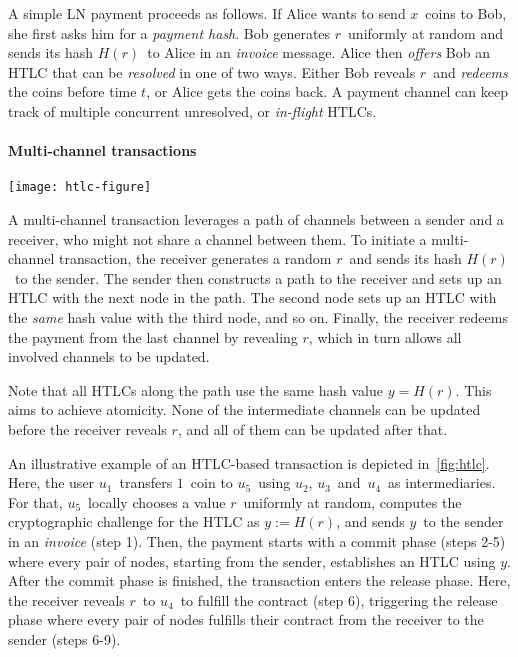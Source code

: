 A simple LN payment proceeds as follows.
If Alice wants to send $x$~coins to Bob, she first asks him for a \textit{payment hash}.
Bob generates $r$~uniformly at random and sends its hash $H(r)$~to Alice in an \textit{invoice} message.
Alice then \textit{offers} Bob an HTLC that can be \textit{resolved} in one of two ways.
Either Bob reveals $r$~and \textit{redeems} the coins before time $t$, or Alice gets the coins back.
A payment channel can keep track of multiple concurrent unresolved, or \textit{in-flight} HTLCs.


\paragraph{Multi-channel transactions}

\begin{figure*}[h]
	\texttt{[image: htlc-figure]}
	\caption{An HTLC-based payment in the Lightning Network.}
	\label{fig:htlc}
\end{figure*}

A multi-channel transaction leverages a path of channels between a sender and a receiver, who might not share a channel between them.
To initiate a multi-channel transaction, the receiver generates a random $r$~and sends its hash $H(r)$~to the sender.
The sender then constructs a path to the receiver and sets up an HTLC with the next node in the path.
The second node sets up an HTLC with the \textit{same} hash value with the third node, and so on.
Finally, the receiver redeems the payment from the last channel by revealing $r$, which in turn allows all involved channels to be updated.

Note that all HTLCs along the path use the same hash value $y=H(r)$.
This aims to achieve atomicity.
None of the intermediate channels can be updated before the receiver reveals $r$, and all of them can be updated after that.

An illustrative example of an HTLC-based transaction is depicted in~\cref{fig:htlc}.
Here, the user $u_1$~transfers $1$~coin to $u_5$~using $u_2$, $u_3$~and~$u_4$~as intermediaries.
For that, $u_5$~locally chooses a value $r$~uniformly at random, computes the cryptographic challenge for the HTLC as $y := H(r)$, and sends $y$~to the sender in an \textit{invoice} (step 1).
Then, the payment starts with a commit phase (steps 2-5) where every pair of nodes, starting from the sender, establishes an HTLC using $y$.
After the commit phase is finished, the transaction enters the release phase.
Here, the receiver reveals $r$~to $u_4$~to fulfill the contract (step 6), triggering the release phase where every pair of nodes fulfills their contract from the receiver to the sender (steps 6-9).

